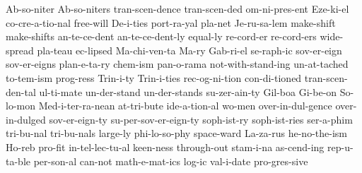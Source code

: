 {Ab-so-niter
Ab-so-niters
tran-scen-dence
tran-scen-ded
om-ni-pres-ent
Eze-ki-el
co-cre-a-tio-nal
free-will
De-i-ties
port-ra-yal
pla-net
Je-ru-sa-lem
make-shift
make-shifts
an-te-ce-dent
an-te-ce-dent-ly
equal-ly
re-cord-er
re-cord-ers
wide-spread
pla-teau
ec-lipsed
Ma-chi-ven-ta
Ma-ry
Gab-ri-el
se-raph-ic
sov-er-eign
sov-er-eigns
plan-e-ta-ry
chem-ism
pan-o-rama
not-with-stand-ing
un-at-tached
to-tem-ism
prog-ress
Trin-i-ty
Trin-i-ties
rec-og-ni-tion
con-di-tioned
tran-scen-den-tal
ul-ti-mate
un-der-stand
un-der-stands
su-zer-ain-ty
Gil-boa
Gi-be-on
So-lo-mon
Med-i-ter-ra-nean
at-tri-bute
ide-a-tion-al
wo-men
over-in-dul-gence
over-in-dulged
sov-er-eign-ty
su-per-sov-er-eign-ty
soph-ist-ry
soph-ist-ries
ser-a-phim
tri-bu-nal
tri-bu-nals
large-ly
phi-lo-so-phy
space-ward
La-za-rus
he-no-the-ism
Ho-reb
pro-fit
in-tel-lec-tu-al
keen-ness
through-out
stam-i-na
as-cend-ing
rep-u-ta-ble
per-son-al
can-not
math-e-mat-ics
log-ic
val-i-date
pro-gres-sive
}

